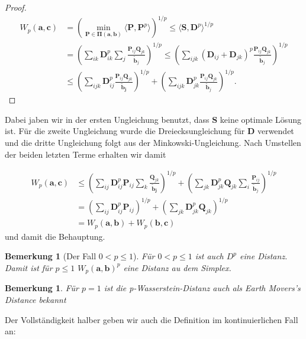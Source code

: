 \documentclass[11pt,a4paper]{article}
\newtheorem{remark}[theorem]{Bemerkung}
\numberwithin{equation}{section}
\begin{document}
\begin{proof}
		\begin{align}
		W_p(\boldsymbol{a},\boldsymbol{c}) &=\left(\min_{\boldsymbol{P \in \boldsymbol{\Pi}(\boldsymbol{a},\boldsymbol{b})}}{\langle \boldsymbol{P},\boldsymbol{P}^p \rangle}\right)^{1/p} \leq \langle \boldsymbol{S}, \boldsymbol{D}^p \rangle ^{1/p} \\
		&= \left( \sum_{ik}{\boldsymbol{D}_{ik}^p} \sum_j{\frac{\boldsymbol{P}_{ij}\boldsymbol{Q}_{jk}}{\tilde{\boldsymbol{b}}_j}}\right)^{1/p} \leq \left(\sum_{ijk}{(\boldsymbol{D}_{ij} + \boldsymbol{D}_{jk})^p \frac{\boldsymbol{P}_{ij}\boldsymbol{Q}_{jk}}{\tilde{\boldsymbol{b}}_j}}\right)^{1/p}\\
		&\leq \left(\sum_{ijk}{\boldsymbol{D}_{ij}^p}\frac{\boldsymbol{P}_{ij}\boldsymbol{Q}_{jk}}{\boldsymbol{\tilde{\boldsymbol{b}}_j}}\right)^{1/p} + \left(\sum_{ijk}{\boldsymbol{D}_{jk}^p \frac{\boldsymbol{P}_{ij}\boldsymbol{Q}_{jk}}{\tilde{\boldsymbol{b}}_j}}\right)^{1/p}.	 	\end{align}
	\end{proof}
	Dabei jaben wir in der ersten Ungleichung benutzt, dass $\boldsymbol{S}$ keine optimale Lösung ist. Für die zweite Ungleichung wurde die Dreiecksungleichung für $\boldsymbol{D}$ verwendet und die dritte Ungleichung folgt aus der Minkowski-Ungleichung.
	Nach Umstellen der beiden letzten Terme erhalten wir damit
	
	\begin{align*}
	W_p(\boldsymbol{a},\boldsymbol{c}) 
	&\leq \left(\sum_{ij}{\boldsymbol{D}_{ij}^p\boldsymbol{P}_{ij}}\sum_k{\frac{\boldsymbol{Q}_{jk}}{\boldsymbol{\tilde{\boldsymbol{b}}_j}}}\right)^{1/p} + \left(\sum_{jk}{\boldsymbol{D}_{jk}^p\boldsymbol{Q}_{jk}}\sum_i{ \frac{\boldsymbol{P}_{ij}}{\tilde{\boldsymbol{b}}_j}}\right)^{1/p}\\
	&= \left(\sum_{ij}{\boldsymbol{D}_{ij}^p\boldsymbol{P}_{ij}}\right)^{1/p}
	+
	\left(\sum_{jk}{\boldsymbol{D}_{jk}^p\boldsymbol{Q}_{jk}}\right)^{1/p}\\
	&= W_p(\boldsymbol{a},\boldsymbol{b})
	+ W_p(\boldsymbol{b},\boldsymbol{c})  
	\end{align*}
	und damit die Behauptung.
	\begin{remark}[Der Fall $0 < p \leq 1$]
		Für $0 < p \leq 1$ ist auch $D^p$ eine Distanz. Damit ist für $ p \leq 1$ $W_p(\boldsymbol{a}, \boldsymbol{b})^p$ eine Distanz au dem Simplex.
		
	\end{remark}
	
	\begin{remark}
		Für $p=1$ ist die p-Wasserstein-Distanz auch als Earth Movers's Distance \cite{rubner2000earth} bekannt
	\end{remark}

	Der Vollständigkeit halber geben wir auch die Definition im kontinuierlichen Fall an:
	
\end{document}
